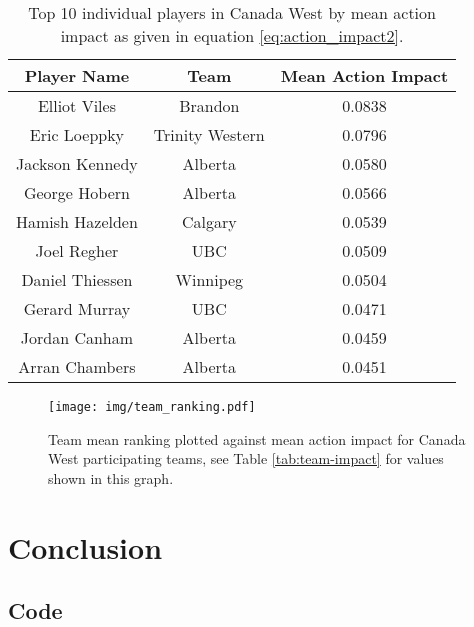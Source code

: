 \documentclass{sfuthesis}
\begin{document}
	\begin{table}
		\centering
		\begin{tabular}{ccc}
			\textbf{Player Name} & \textbf{Team}   & \textbf{Mean Action Impact} \\ \hline
			Elliot Viles         & Brandon         & 0.0838                      \\
			Eric Loeppky         & Trinity Western & 0.0796                      \\
			Jackson Kennedy      & Alberta         & 0.0580                      \\
			George Hobern        & Alberta         & 0.0566                      \\
			Hamish Hazelden      & Calgary         & 0.0539                      \\
			Joel Regher          & UBC             & 0.0509                      \\
			Daniel Thiessen      & Winnipeg        & 0.0504                      \\
			Gerard Murray        & UBC             & 0.0471                      \\
			Jordan Canham        & Alberta         & 0.0459                      \\
			Arran Chambers       & Alberta         & 0.0451                     
		\end{tabular}
		\caption{Top 10 individual players in Canada West by mean action impact as given in equation \eqref{eq:action_impact2}.}
		\label{tab:player-impact}
	\end{table}
	
	\begin{figure}
		\texttt{[image: img/team\_ranking.pdf]}
		\caption{Team mean ranking plotted against mean action impact for Canada West participating teams, see Table \ref{tab:team-impact} for values shown in this graph.}
		\label{fig:team-impact}
	\end{figure}
	
	\chapter{Conclusion}
	
	
	
	\backmatter%
	
	
	
	\begin{appendices} %
		\chapter{Code}
	\end{appendices}
\end{document}

